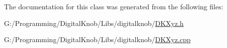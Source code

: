 The documentation for this class was generated from the following files\-:\begin{DoxyCompactItemize}
\item 
G\-:/\-Programming/\-Digital\-Knob/\-Libs/digitalknob/\hyperlink{_d_k_xyz_8h}{D\-K\-Xyz.\-h}\item 
G\-:/\-Programming/\-Digital\-Knob/\-Libs/digitalknob/\hyperlink{_d_k_xyz_8cpp}{D\-K\-Xyz.\-cpp}\end{DoxyCompactItemize}
